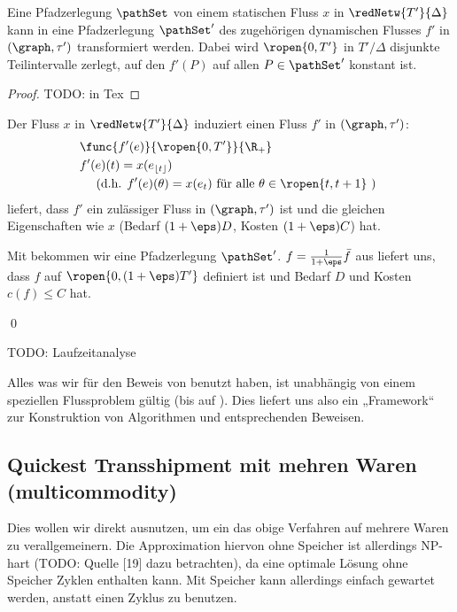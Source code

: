 \begin{lemma}\label{lem:path_decomp}
    Eine Pfadzerlegung $\pathSet$ von einem statischen Fluss $x$ in
    $\redNetw{T'}{\Delta}$ kann in eine Pfadzerlegung $\pathSet'$ des
    zugehörigen dynamischen Flusses $f'$ in $(\graph, \tau')$ 
    transformiert werden. Dabei wird $\ropen{0, T'}$ in $T'/\Delta$
    disjunkte Teilintervalle zerlegt, auf den $f'(P)$ auf allen $P \in \pathSet'$
    konstant ist.
    
    \begin{proof}
        TODO: in Tex
    \end{proof}
\end{lemma}

\begin{standaloneProof}
    Der Fluss $x$ in $\redNetw{T'}{\Delta}$ induziert einen Fluss $f'$ in
    $(\graph, \tau')$:
    \begin{align*}
        & \func{f'(e)}{\ropen{0,T'}}{\R_+} \\
        & f'(e)(t) = x(e_{\lfloor t \rfloor}) \\
        & \quad \text{ (d.h. } f'(e)(\theta) = x(e_t)
            \text{ für alle } \theta \in \ropen{t, t+1} \text{ ) }
    \end{align*}
     liefert, dass $f'$ ein zulässiger Fluss in
    $(\graph, \tau')$ ist und die gleichen Eigenschaften wie $x$
    (Bedarf $(1+\eps)D$, Kosten $(1+\eps)C$) hat.
    
    Mit  bekommen wir eine Pfadzerlegung $\pathSet'$.
    $f = \frac{1}{1+\eps} \bar{f}$ aus  liefert uns, dass
    $f$ auf $\ropen{0, (1 + \eps)T'}$ definiert ist und Bedarf $D$ und Kosten
    $c(f) \leq C$ hat.
    \begin{flushright}\qed \end{flushright}
\end{standaloneProof}

TODO: Laufzeitanalyse

\begin{remark}
    Alles was wir für den Beweis von  benutzt haben, ist
    unabhängig von einem speziellen Flussproblem gültig
    (bis auf ). Dies liefert uns also ein „Framework“
    zur Konstruktion von Algorithmen und entsprechenden Beweisen.
\end{remark}

\subsection*{Quickest Transshipment mit mehren Waren (multicommodity)}
Dies wollen wir direkt ausnutzen, um ein das obige Verfahren auf mehrere
Waren zu verallgemeinern. Die Approximation hiervon ohne Speicher ist allerdings
NP-hart (TODO: Quelle [19] dazu betrachten), da eine optimale Lösung ohne Speicher
Zyklen enthalten kann. Mit Speicher kann allerdings einfach gewartet werden,
anstatt einen Zyklus zu benutzen.

